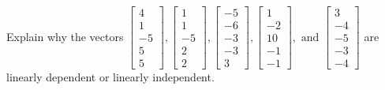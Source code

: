 \documentclass{article}
\begin{document}
\begin{exerciseStatement}
    Explain why the vectors \(\left[\begin{array}{r}
4 \\
1 \\
-5 \\
5 \\
5
\end{array}\right] , \left[\begin{array}{r}
1 \\
1 \\
-5 \\
2 \\
2
\end{array}\right] , \left[\begin{array}{r}
-5 \\
-6 \\
-3 \\
-3 \\
3
\end{array}\right] , \left[\begin{array}{r}
1 \\
-2 \\
10 \\
-1 \\
-1
\end{array}\right] , \text{ and } \left[\begin{array}{r}
3 \\
-4 \\
-5 \\
-3 \\
-4
\end{array}\right]\) are linearly dependent or linearly independent.


  
\end{exerciseStatement}
\end{document}

